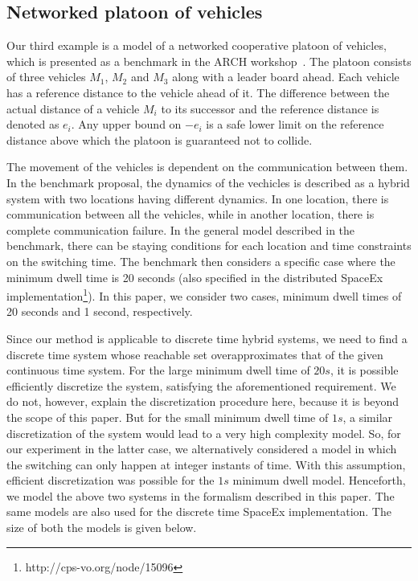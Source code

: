 \subsection{Networked platoon of vehicles}
Our third example is a model of a networked cooperative platoon of
vehicles, which is presented as a benchmark in the ARCH
workshop~\cite{makhlouf2014networked}.  The platoon consists of three
vehicles $M_1$, $M_2$ and $M_3$ along with a leader board ahead.  Each
vehicle has a reference distance to the vehicle ahead of it.  The
difference between the actual distance of a vehicle $M_i$ to its
successor and the reference distance is denoted as $e_i$.  Any upper
bound on $-e_i$ is a safe lower limit on the reference distance above
which the platoon is guaranteed not to collide.

The movement of the vehicles is dependent on the communication between
them.  In the benchmark proposal, the dynamics of the vechicles is
described as a hybrid system with two locations having different
dynamics.  In one location, there is communication between all the
vehicles, while in another location, there is complete communication
failure.  In the general model described in the benchmark, there can
be staying conditions for each location and time constraints on the
switching time.  The benchmark then considers a specific case where
the minimum dwell time is 20 seconds (also specified in the
distributed SpaceEx
implementation\footnote{http://cps-vo.org/node/15096}).  In this
paper, we consider two cases, minimum dwell times of 20 seconds and 1
second, respectively.


  Since our method is applicable to discrete time
hybrid systems, we need to find a discrete time system whose reachable
set overapproximates that of the given continuous time system.  For
the large minimum dwell time of $20s$, it is possible efficiently
discretize the system, satisfying the aforementioned requirement.  We
do not, however, explain the discretization procedure here, because it
is beyond the scope of this paper.  But for the small minimum dwell
time of $1s$, a similar discretization of the system would lead to a
very high complexity model.  So, for our experiment in the latter
case, we alternatively considered a model in which the switching can
only happen at integer instants of time.  With this assumption,
efficient discretization was possible for the $1s$ minimum dwell
model.  Henceforth, we model the above two systems in the formalism
described in this paper. The same models are also used for the
discrete time SpaceEx implementation.  The size of both the models is
given below.


